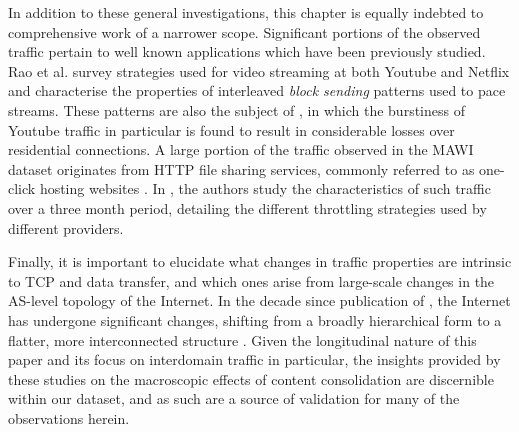 In addition to these general investigations, this chapter is equally indebted to comprehensive work of a narrower scope.
Significant portions of the observed traffic pertain to well known applications which have been previously studied.
Rao et al. \cite{Rao:2011p547} survey strategies used for video streaming at both Youtube and Netflix and characterise the properties of interleaved \emph{block sending} patterns used to pace streams.
These patterns are also the subject of \cite{Alcock:2011p575}, in which the burstiness of Youtube traffic in particular is found to result in considerable losses over residential connections.
A large portion of the traffic observed in the MAWI dataset originates from HTTP file sharing services, commonly referred to as one-click hosting websites \cite{oneclick1}.
In \cite{SanjuasCuxart:2012p588}, the authors study the characteristics of such traffic over a three month period, detailing the different throttling strategies used by different providers.

Finally, it is important to elucidate what changes in traffic properties are intrinsic to TCP and data transfer, and which ones arise from large-scale changes in the AS-level topology of the Internet. In the decade since publication of \cite{Zhang:2002p85}, the Internet has undergone significant changes, shifting from a broadly hierarchical form to a flatter, more interconnected structure \cite{Labovitz:2010p175,Ager:2012p567}.
Given the longitudinal nature of this paper and its focus on interdomain traffic in particular, the insights provided by these studies on the macroscopic effects of content consolidation are discernible within our dataset, and as such are a source of validation for many of the observations herein.
